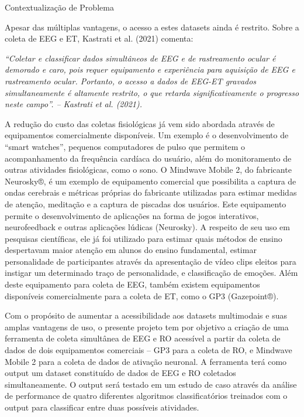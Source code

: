 \documentclass[a4paper, 12pt]{ppgeb}
\makeatletter
\renewcommand{\section}{\@startsection
{section}
{1}
{0mm}
{-\baselineskip}
{0.5\baselineskip}
{\large\bfseries\scshape}}
\makeatother
\begin{document}

\section{Contextualização de Problema}

Apesar das múltiplas vantagens, o acesso a estes datasets ainda é restrito. Sobre a coleta de EEG e ET, Kastrati et al. (2021) comenta:


\textit{“Coletar e classificar dados simultâneos de EEG e de rastreamento ocular é demorado e caro, pois requer equipamento e experiência para aquisição de EEG e rastreamento ocular. Portanto, o acesso a dados de EEG-ET gravados simultaneamente é altamente restrito, o que retarda significativamente o progresso neste campo”. – Kastrati et al. (2021).}

A redução do custo das coletas fisiológicas já vem sido abordada através de equipamentos comercialmente disponíveis. Um exemplo é o desenvolvimento de “smart watches”, pequenos computadores de pulso que permitem o acompanhamento da frequência cardíaca do usuário, além do monitoramento de outras atividades fisiológicas, como o sono. O Mindwave Mobile 2, do fabricante Neurosky®, é um exemplo de equipamento comercial que possibilita a captura de ondas cerebrais e métricas próprias do fabricante utilizadas para estimar medidas de atenção, meditação e a captura de piscadas dos usuários. Este equipamento permite o desenvolvimento de aplicações na forma de jogos interativos, neurofeedback e outras aplicações lúdicas (Neurosky). A respeito de seu uso em pesquisas científicas, ele já foi utilizado para estimar quais métodos de ensino despertavam maior atenção em alunos do ensino fundamental, estimar personalidade de participantes através da apresentação de vídeo clips eleitos para instigar um determinado traço de personalidade, e classificação de emoções. Além deste equipamento para coleta de EEG, também existem equipamentos disponíveis comercialmente para a coleta de ET, como o GP3 (Gazepoint®). 


Com o propósito de aumentar a acessibilidade aos datasets multimodais e suas amplas vantagens de uso, o presente projeto tem por objetivo a criação de uma ferramenta de coleta simultânea de EEG e RO acessível a partir da coleta de dados de dois equipamentos comerciais – GP3 para a coleta de RO, e Mindwave Mobile 2 para a coleta de dados de ativação neuronal. A ferramenta terá como output um dataset constituído de dados de EEG e RO coletados simultaneamente. O output será testado em um estudo de caso através da análise de performance de quatro diferentes algoritmos classificatórios treinados com o output para classificar entre duas possíveis atividades. 
\end{document}
